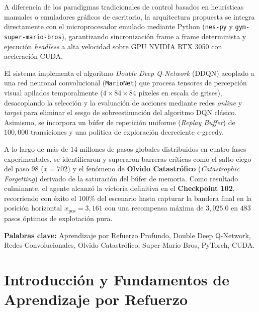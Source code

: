 \documentclass[11pt,letterpaper]{article}
\begin{document}
A diferencia de los paradigmas tradicionales de control basados en heurísticas manuales o emuladores gráficos de escritorio, la arquitectura propuesta se integra directamente con el microprocesador emulado mediante Python (\texttt{nes-py} y \texttt{gym-super-mario-bros}), garantizando sincronización frame a frame determinista y ejecución \textit{headless} a alta velocidad sobre GPU NVIDIA RTX 3050 con aceleración CUDA.

El sistema implementa el algoritmo \textit{Double Deep Q-Network} (DDQN) acoplado a una red neuronal convolucional (\texttt{MarioNet}) que procesa tensores de percepción visual apilados temporalmente ($4 \times 84 \times 84$ píxeles en escala de grises), desacoplando la selección y la evaluación de acciones mediante redes \textit{online} y \textit{target} para eliminar el sesgo de sobreestimación del algoritmo DQN clásico. Asimismo, se incorpora un búfer de repetición uniforme (\textit{Replay Buffer}) de $100,000$ transiciones y una política de exploración decreciente $\epsilon$-greedy.

A lo largo de más de $14$ millones de pasos globales distribuidos en cuatro fases experimentales, se identificaron y superaron barreras críticas como el salto ciego del paso 98 ($x = 702$) y el fenómeno de \textbf{Olvido Catastrófico} (\textit{Catastrophic Forgetting}) derivado de la saturación del búfer de memoria. Como resultado culminante, el agente alcanzó la victoria definitiva en el \textbf{Checkpoint 102}, recorriendo con éxito el 100\% del escenario hasta capturar la bandera final en la posición horizontal $x_{\text{pos}} = 3,161$ con una recompensa máxima de $3,025.0$ en $483$ pasos óptimos de explotación pura.

\vspace{0.8cm}
\noindent\textbf{Palabras clave:} Aprendizaje por Refuerzo Profundo, Double Deep Q-Network, Redes Convolucionales, Olvido Catastrófico, Super Mario Bros, PyTorch, CUDA.

\newpage

\tableofcontents
\newpage

\section{Introducción y Fundamentos de Aprendizaje por Refuerzo}
\end{document}
